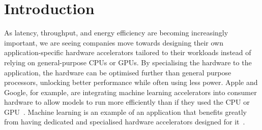 \chapter{Introduction}%
\label{sec:introduction}




As latency, throughput, and energy efficiency are becoming increasingly
important, we are seeing companies move towards designing their own
application-specific hardware accelerators tailored to their workloads instead
of relying on general-purpose \glspl{CPU} or \glspl{GPU}.  By specialising the
hardware to the application, the hardware can be optimised further than general
purpose processors, unlocking better performance while often using less power.
Apple and Google, for example, are integrating machine learning accelerators
into consumer hardware to allow models to run more efficiently than if they used
the \gls{CPU} or \gls{GPU}~\cite{apple22_dtane, gupta23_gtg}.  Machine learning
is an example of an application that benefits greatly from having dedicated and
specialised hardware accelerators designed for
it~\cite{reuther20_survey_machin_learn_accel}.

